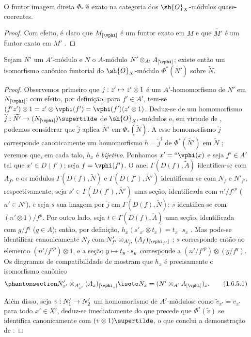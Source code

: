 \documentclass[oneside]{amsart}
\makeatletter
\newcommand{\ega@arrow}[2]{\mathchoice{#1}{#2}{#2}{#2}}
\let\ega@shortmapsto\mapsto
\renewcommand{\to}{\ega@arrow{\longrightarrow}{\rightarrow}}
\renewcommand{\mapsto}{\ega@arrow{\longmapsto}{\ega@shortmapsto}}
\let\EGAOriginalLabel\label
\renewcommand{\label}[1]{\phantomsection\EGAOriginalLabel{#1}}
\makeatother
\begin{document}
\begin{corollary}[1.6.4]
\label{I.1.6.4}
O funtor imagem direta $\Phi_*$ é exato na categoria dos
$\sh{O}_X$-módulos quase-coerentes.
\end{corollary}

\begin{proof}
Com efeito, é claro que $M_{[\vphi]}$ é um funtor exato em $M$ e que
$\widetilde{M'}$ é um funtor exato em $M'$ .
\end{proof}

\begin{proposition}[1.6.5]
\label{I.1.6.5}
Sejam $N'$ um $A'$-módulo e $N$ o $A$-módulo
$N'\otimes_{A'}A_{[\vphi]}$; existe então um isomorfismo canônico funtorial
do $\sh{O}_X$-módulo $\Phi^*(\widetilde{N'})$ sobre $\widetilde{N}$.
\end{proposition}

\begin{proof}
Observemos primeiro que $j:z'\mapsto z'\otimes 1$ é um $A'$-homomorfismo de
$N'$ em $N_{[\vphi]}$: com efeito, por definição, para $f'\in A'$, tem-se
$(f' z')\otimes 1=z'\otimes\vphi(f')=\vphi(f')(z'\otimes 1)$.
Deduz-se de  um homomorfismo
$\widetilde{j}:\widetilde{N'}\to(N_{[\vphi]})\supertilde$ de
$\sh{O}_{X'}$-módulos e, em virtude de , podemos considerar
que $\widetilde{j}$ aplica $\widetilde{N'}$ em $\Phi_*(\widetilde{N})$.
A esse homomorfismo $\widetilde{j}$ corresponde canonicamente um homomorfismo
$h=\widetilde{j}^\sharp$ de $\Phi^*(\widetilde{N'})$ em $\widetilde{N}$
; veremos que, em cada talo, $h_x$ é \emph{bijetivo}.
Ponhamos $x'={}^a\vphi(x)$ e seja $f'\in A'$ tal que $x'\in D(f')$; seja
$f=\vphi(f')$.
O anel $\Gamma(D(f),\widetilde{A})$ identifica-se com $A_f$, e os módulos
$\Gamma(D(f),\widetilde{N})$ e $\Gamma(D(f'),\widetilde{N'})$ identificam-se
com $N_f$ e $N'_{f'}$, respectivamente; seja
$s'\in\Gamma(D(f'),\widetilde{N'})$ uma seção, identificada com
$n'/{f'}^p$ ($n'\in N'$), e seja $s$ sua imagem por $\widetilde{j}$ em
$\Gamma(D(f),\widetilde{N})$; $s$ identifica-se com $(n'\otimes 1)/f^p$.
Por outro lado, seja $t\in\Gamma(D(f),\widetilde{A})$ uma seção, identificada
com $g/f^q$ ($g\in A$); então, por definição,
$h_x(s'_{x'}\otimes t_x)=t_x\cdot s_x$ .
Mas pode-se identificar canonicamente $N_f$ com
$N'_{f'}\otimes_{A'_{f'}}(A_f)_{[\vphi_{f'}]}$ ; $s$
corresponde então ao elemento $(n'/{f'}^p)\otimes 1$, e a seção
$y\mapsto t_y\cdot s_y$ corresponde a $(n'/{f'}^p)\otimes(g/f^q)$.
Os diagramas de compatibilidade de  mostram que $h_x$ é
precisamente o isomorfismo canônico
\[
  \label{I.1.6.5.1}
  N'_{x'}\otimes_{A'_{x'}}(A_x)_{[\vphi_x]}\isoto
  N_x=(N'\otimes_{A'}A_{[\vphi]})_x.
  \tag{1.6.5.1}
\]

Além disso, seja $v:N_1'\to N_2'$ um homomorfismo de $A'$-módulos; como
$\widetilde{v}_{x'}=v_{x'}$ para todo $x'\in X'$, deduz-se imediatamente do
que precede que $\Phi^*(\widetilde{v})$ se identifica canonicamente com
$(v\otimes 1)\supertilde$, o que conclui a demonstração de .
\end{proof}
\end{document}

